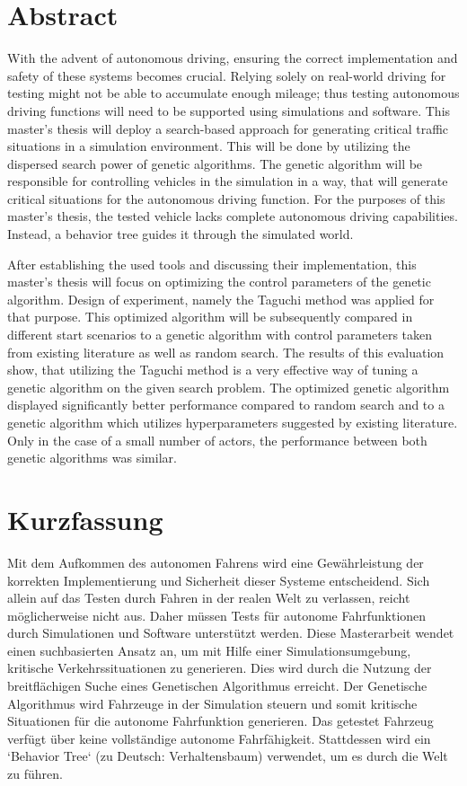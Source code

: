\chapter*{Abstract}
\label{chap:abstract}

With the advent of autonomous driving, ensuring the correct implementation and safety of these systems becomes crucial. Relying solely on real-world driving for testing might not be able to accumulate enough mileage; thus testing autonomous driving functions will need to be supported using simulations and software. This master's thesis will deploy a search-based approach for generating critical traffic situations in a simulation environment. This will be done by utilizing the dispersed search power of genetic algorithms. The genetic algorithm will be responsible for controlling vehicles in the simulation in a way, that will generate critical situations for the autonomous driving function. For the purposes of this master's thesis, the tested vehicle lacks complete autonomous driving capabilities. Instead, a behavior tree guides it through the simulated world.

After establishing the used tools and discussing their implementation, this master's thesis will focus on optimizing the control parameters of the genetic algorithm. Design of experiment, namely the Taguchi method was applied for that purpose. This optimized algorithm will be subsequently compared in different start scenarios to a genetic algorithm with control parameters taken from existing literature as well as random search. The results of this evaluation show, that utilizing the Taguchi method is a very effective way of tuning a genetic algorithm on the given search problem. The optimized genetic algorithm displayed significantly better performance compared to random search and to a genetic algorithm which utilizes hyperparameters suggested by existing literature. Only in the case of a small number of actors, the performance between both genetic algorithms was similar.


\chapter*{Kurzfassung}
\label{chap:kurzfassung}
Mit dem Aufkommen des autonomen Fahrens wird eine Gewährleistung der korrekten Implementierung und Sicherheit dieser Systeme entscheidend. Sich allein auf das Testen durch Fahren in der realen Welt zu verlassen, reicht möglicherweise nicht aus. Daher müssen Tests für autonome Fahrfunktionen durch Simulationen und Software unterstützt werden. Diese Masterarbeit wendet einen suchbasierten Ansatz an, um mit Hilfe einer Simulationsumgebung, kritische Verkehrssituationen zu generieren. Dies wird durch die Nutzung der breitflächigen Suche eines Genetischen Algorithmus erreicht. Der Genetische Algorithmus wird Fahrzeuge in der Simulation steuern und somit kritische Situationen für die autonome Fahrfunktion generieren. Das getestet Fahrzeug verfügt über keine vollständige autonome Fahrfähigkeit. Stattdessen wird ein ‘Behavior Tree‘ (zu Deutsch: Verhaltensbaum) verwendet, um es durch die Welt zu führen.

